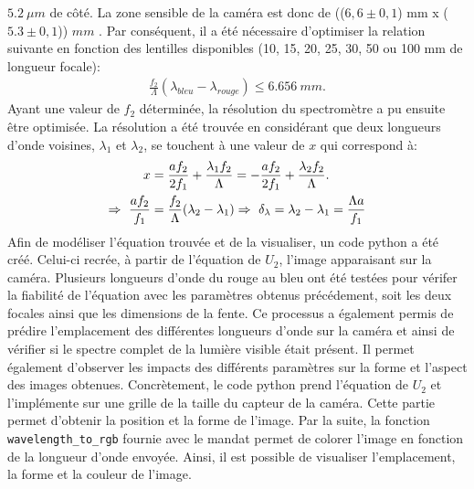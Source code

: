 \documentclass[conference]{IEEEtran}
\begin{document}
$5.2\ \mu m$ de côté. La zone sensible de la caméra est donc de (($6,6\pm0,1$) mm x ($5.3\pm0,1$)) $mm$ \cite{camera}. Par conséquent, il a été nécessaire d'optimiser la relation suivante
en fonction des lentilles disponibles (10, 15, 20, 25, 30, 50 ou 100 mm de longueur focale):
\begin{align}\label{spectre}
    \frac{f_2}{\Lambda}(\lambda_{bleu}-\lambda_{rouge})\leq 6.656\ mm.
\end{align}
Ayant une valeur de $f_2$ déterminée, la résolution du spectromètre a pu ensuite être optimisée. La résolution a été trouvée en
considérant que deux longueurs d'onde voisines, $\lambda_1$ et $\lambda_2$, se touchent à une valeur de $x$ qui correspond à:
\begin{align}\label{resolution}
    x&=\frac{a f_2}{2f_1}+\frac{\lambda_1 f_2}{\Lambda}=-\frac{a f_2}{2f_1}+\frac{\lambda_2 f_2}{\Lambda}.\notag \\
    \Rightarrow\ \frac{af_2}{f_1}&=\frac{f_2}{\Lambda}(\lambda_2-\lambda_1)\Rightarrow\ \delta_{\lambda}=\lambda_2-\lambda_1=\frac{\Lambda a}{f_1}
\end{align}
Afin de modéliser l'équation trouvée et de la visualiser, un code python a été créé. Celui-ci recrée, à partir de l'équation
de $U_2$, l'image apparaisant sur la caméra. Plusieurs longueurs d'onde du rouge au bleu ont été testées pour vérifer 
la fiabilité de l'équation avec les paramètres obtenus précédement, soit les deux focales ainsi que les dimensions de la fente. 
Ce processus a également permis de prédire l'emplacement des différentes longueurs d'onde sur la caméra 
et ainsi de vérifier si le spectre complet de la lumière visible était présent. Il permet également d'observer les
impacts des différents paramètres sur la forme et l'aspect des images obtenues. Concrètement, le code python prend 
l'équation de $U_2$ et l'implémente sur une grille de la taille du capteur de la caméra. Cette partie permet d'obtenir 
la position et la forme de l'image. Par la suite, la fonction \texttt{wavelength\_to\_rgb} fournie avec le mandat permet de colorer l'image en fonction
de la longueur d'onde envoyée. Ainsi, il est possible de visualiser l'emplacement, la forme et la couleur de l'image.    
\end{document}
